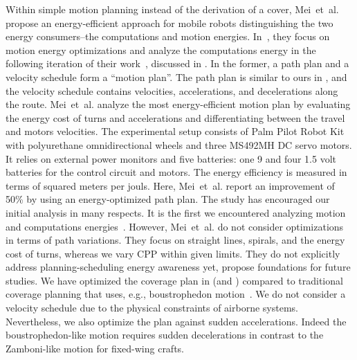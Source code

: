 Within simple motion planning instead of the derivation of a cover, Mei~et~al. propose an energy-efficient approach for mobile robots distinguishing the two energy consumers--the computations and motion energies. In~\citep{mei2004energy}, they focus on motion energy optimizations and analyze the computations energy in the following iteration of their work~\citep{mei2005case}, discussed in . In the former, a path plan and a velocity schedule form a ``motion plan''. The path plan is similar to ours in , and the velocity schedule contains velocities, accelerations, and decelerations along the route. Mei~et~al. analyze the most energy-efficient motion plan by evaluating the energy cost of turns and accelerations and differentiating between the travel and motors velocities. 
The experimental setup consists of Palm Pilot Robot Kit with polyurethane omnidirectional wheels and three MS492MH DC servo motors. It relies on external power monitors 
and five batteries: one 9 and four 1.5 volt batteries for the control circuit and motors. The energy efficiency is measured in terms of squared meters per jouls. Here, Mei~et~al. report an improvement of 50\% by using an energy-optimized path plan. The study has encouraged our initial analysis in many respects. It is the first we encountered analyzing motion and computations energies~\citep{mei2005case}. However, Mei~et~al. do not consider optimizations in terms of path variations. They focus on straight lines, spirals, and the energy cost of turns, whereas we vary CPP within given limits. They do not explicitly address planning-scheduling energy awareness yet, propose foundations for future studies. 
We have optimized the coverage plan in  (and ) compared to traditional coverage planning that uses, e.g., boustrophedon motion~\citep{lavalle2006planning}. We do not consider a velocity schedule due to the physical constraints of airborne systems. Nevertheless, we also optimize the plan against sudden accelerations. Indeed the boustrophedon-like motion requires sudden decelerations in contrast to the Zamboni-like motion for fixed-wing crafts. 


